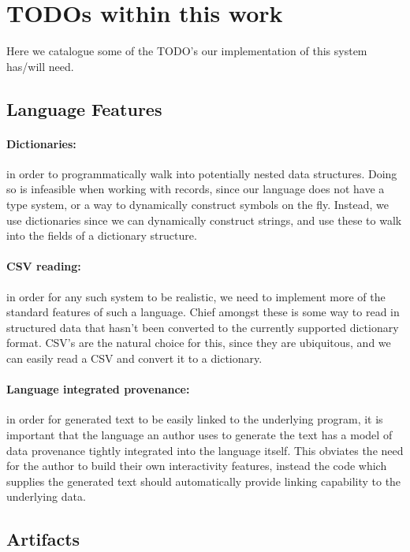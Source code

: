 \section{TODOs within this work}
\label{sec:implementation}

Here we catalogue some of the TODO's our implementation of this system has/will need.

\subsection{Language Features}

\paragraph{Dictionaries:} in order to programmatically walk into potentially nested data structures.
Doing so is infeasible when working with records, since our language does not have a type system, 
or a way to dynamically construct symbols on the fly. Instead, we use dictionaries since we can
dynamically construct strings, and use these to walk into the fields of a dictionary structure.

\paragraph{CSV reading:} in order for any such system to be realistic, we need to implement more of the
standard features of such a language. Chief amongst these is some way to read in structured data that hasn't
been converted to the currently supported dictionary format. CSV's are the natural choice for this, since they
are ubiquitous, and we can easily read a CSV and convert it to a dictionary.

\paragraph{Language integrated provenance:} in order for generated text to be easily linked to the
underlying program, it is important that the language an author uses to generate the text has a
model of data provenance tightly integrated into the language itself. This obviates the need for the
author to build their own interactivity features, instead the code which supplies the generated text
should automatically provide linking capability to the underlying data. 

\subsection{Artifacts}

